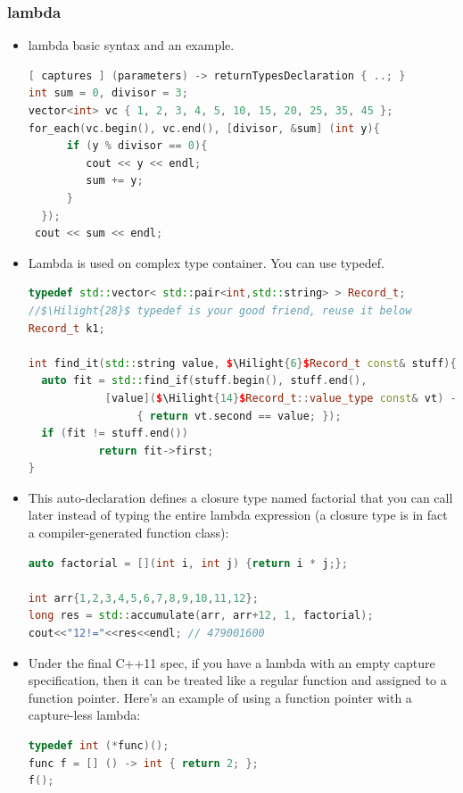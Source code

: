 \documentclass[a4paper,12pt,twoside]{book}
\newcommand{\Hilight}[1]{\makebox[0pt][l]{\color{yellow}\rule[-3pt]{#1em}{11pt}}}
\begin{document}
\subsubsection{lambda}

\begin{itemize}
\item lambda basic syntax and an example.
\begin{lstlisting}[frame=single, language=c++]
[ captures ] (parameters) -> returnTypesDeclaration { ..; }
int sum = 0, divisor = 3;
vector<int> vc { 1, 2, 3, 4, 5, 10, 15, 20, 25, 35, 45 };
for_each(vc.begin(), vc.end(), [divisor, &sum] (int y){
      if (y % divisor == 0){
         cout << y << endl;
         sum += y;
      }
  });
 cout << sum << endl;
\end{lstlisting}

\item Lambda is used on complex type container. You can use typedef.
\begin{lstlisting}[frame=single, language=c++, mathescape=true]
typedef std::vector< std::pair<int,std::string> > Record_t;
//$\Hilight{28}$ typedef is your good friend, reuse it below
Record_t k1;

int find_it(std::string value, $\Hilight{6}$Record_t const& stuff){
  auto fit = std::find_if(stuff.begin(), stuff.end(),
            [value]($\Hilight{14}$Record_t::value_type const& vt) -> bool
                 { return vt.second == value; });
  if (fit != stuff.end())
           return fit->first;
}
\end{lstlisting}

\item This auto-declaration defines a closure type named factorial that you can call later instead of typing the entire lambda expression (a closure type is in fact a compiler-generated function class):
\begin{lstlisting}[frame=single, language=c++]
auto factorial = [](int i, int j) {return i * j;};

int arr{1,2,3,4,5,6,7,8,9,10,11,12};
long res = std::accumulate(arr, arr+12, 1, factorial);
cout<<"12!="<<res<<endl; // 479001600
\end{lstlisting}

\item Under the final C++11 spec, if you have a lambda with an empty capture specification, then it can be treated like a regular function and assigned to a function pointer. Here's an example of using a function pointer with a capture-less lambda:
\begin{lstlisting}[frame=single, language=c++]
typedef int (*func)();
func f = [] () -> int { return 2; };
f();
\end{lstlisting}


\end{itemize}
\end{document}
